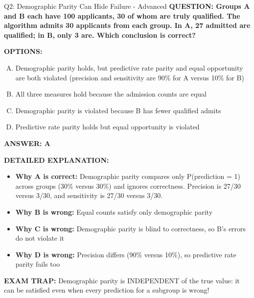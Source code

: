 \documentclass[8pt]{beamer}
\begin{document}
\begin{frame}[shrink=6]{Q2: Demographic Parity Can Hide Failure - Advanced}
\fontsize{6.5}{7.5}\selectfont
\textbf{QUESTION: Groups A and B each have 100 applicants, 30 of whom are truly qualified. The algorithm admits 30 applicants from each group. In A, 27 admitted are qualified; in B, only 3 are. Which conclusion is correct?}

\vspace{0.1cm}
\textbf{OPTIONS:}
\begin{enumerate}[A.]
\item Demographic parity holds, but predictive rate parity and equal opportunity are both violated (precision and sensitivity are 90\% for A versus 10\% for B)
\item All three measures hold because the admission counts are equal
\item Demographic parity is violated because B has fewer qualified admits
\item Predictive rate parity holds but equal opportunity is violated
\end{enumerate}

\vspace{0.1cm}
\textcolor{myblue}{\textbf{ANSWER: A}}

\vspace{0.1cm}
\textbf{DETAILED EXPLANATION:}
\begin{itemize}
\item \textbf{Why A is correct:} Demographic parity compares only P(prediction = 1) across groups (30\% versus 30\%) and ignores correctness. Precision is 27/30 versus 3/30, and sensitivity is 27/30 versus 3/30.
\item \textbf{Why B is wrong:} Equal counts satisfy only demographic parity
\item \textbf{Why C is wrong:} Demographic parity is blind to correctness, so B's errors do not violate it
\item \textbf{Why D is wrong:} Precision differs (90\% versus 10\%), so predictive rate parity fails too
\end{itemize}

\textcolor{myred}{\textbf{EXAM TRAP:}} Demographic parity is INDEPENDENT of the true value: it can be satisfied even when every prediction for a subgroup is wrong!
\end{frame}
\end{document}
